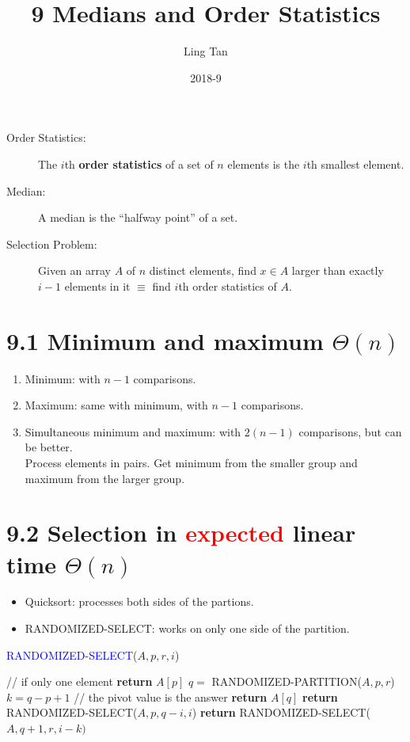 \documentclass[a4paper]{article}
\title{9 Medians and Order Statistics}
\author{Ling Tan}
\date{2018-9}
\begin{document}
\begin{description}
\item[Order Statistics:] The $i$th \textbf{order statistics} of a set of $n$ elements is the $i$th smallest element.
\item[Median:] A median is the “halfway point” of a set.
\item[Selection Problem:] Given an array $A$ of $n$ distinct elements, find $x\in A$ larger than exactly $i-1$ elements in it $\equiv$ find $i$th order statistics of $A$.
\end{description}

\section*{9.1 Minimum and maximum $\Theta(n)$}
\begin{enumerate}
    \item Minimum: with $n-1$ comparisons.
    \item Maximum: same with minimum, with $n-1$ comparisons.
    \item Simultaneous minimum and maximum: with $2(n-1)$ comparisons, but can be better.\\
    Process elements in pairs. Get minimum from the smaller group and maximum from the larger group.
\end{enumerate}
\section*{9.2 Selection in \textcolor{red}{expected} linear time $\Theta(n)$}
\begin{itemize}
    \item Quicksort: processes both sides of the partions.
    \item RANDOMIZED-SELECT: works on only one side of the partition.
\end{itemize}
\begin{algorithm}[H]%
    \caption{\textcolor{blue}{RANDOMIZED-SELECT}($A,p,r,i$)}
    \begin{algorithmic}[1] %
         // if only one element
            \State \textbf{return }$A[p]$
        \EndIf
        \State $q=$ RANDOMIZED-PARTITION($A,p,r$)
        \State $k=q-p+1$
         // the pivot value is the answer
            \State \textbf{return } $A[q]$
            \State \textbf{return } RANDOMIZED-SELECT($A,p,q-i,i$)
        \Else
            \State \textbf{return } RANDOMIZED-SELECT($A,q+1,r,i-k)$
        \EndIf
    \end{algorithmic}
\end{algorithm}
\end{document}
